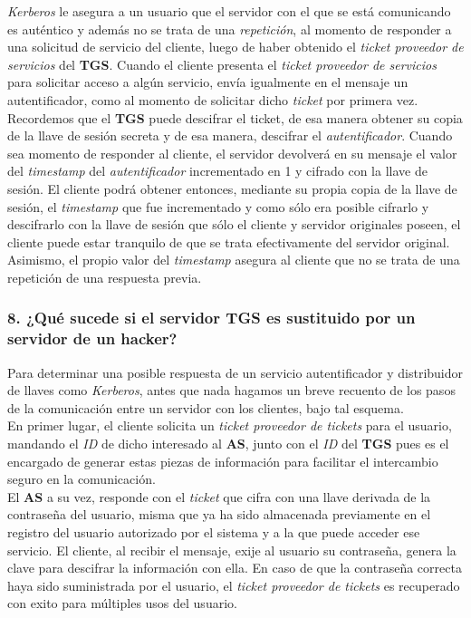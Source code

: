 \documentclass[12pt]{article}
\begin{document}
\textit{Kerberos} le asegura a un usuario que el servidor con el que se está comunicando es auténtico y además no se trata de una
\textit{repetición}, al momento de responder a una solicitud de servicio del cliente, luego de haber obtenido el \textit{ticket proveedor de servicios} del \textbf{TGS}.
Cuando el cliente presenta el \textit{ticket proveedor de servicios} para solicitar acceso a algún servicio, envía igualmente en el mensaje un autentificador, como al momento de solicitar dicho \textit{ticket} por primera vez. Recordemos que el \textbf{TGS} puede descifrar el ticket, de esa manera obtener su copia de la llave de sesión secreta y de esa manera, descifrar el \textit{autentificador}.
Cuando sea momento de responder al cliente, el servidor devolverá en su mensaje el valor del \textit{timestamp} del \textit{autentificador} incrementado en 1 y cifrado con
la llave de sesión. El cliente podrá obtener entonces, mediante su propia copia de la llave de sesión, el \textit{timestamp} que fue incrementado y como sólo era posible cifrarlo y descifrarlo con la llave de sesión que sólo el cliente y servidor originales poseen, el cliente puede estar tranquilo de que se trata efectivamente del servidor original. Asimismo, el propio valor del \textit{timestamp} asegura al cliente que no se trata de una
repetición de una respuesta previa. 


\subsubsection*{8. ¿Qué sucede si el servidor TGS es sustituido por un servidor de un hacker? }
Para determinar una posible respuesta de un servicio autentificador y distribuidor de llaves como
\textit{Kerberos}, antes que nada hagamos un breve recuento de los pasos de la comunicación entre un
servidor con los clientes, bajo tal esquema. \\

En primer lugar, el cliente solicita un \textit{ticket proveedor de tickets} para el usuario, mandando
el \textit{ID} de dicho interesado al \textbf{AS}, junto con el \textit{ID} del \textbf{TGS} pues es
el encargado de generar estas piezas de información para facilitar el intercambio seguro en la comunicación.\\

El \textbf{AS} a su vez, responde con el \textit{ticket} que cifra con una llave derivada de la contraseña del usuario, misma que ya ha sido almacenada previamente en el registro del usuario autorizado por
el sistema y a la que puede acceder ese servicio. El cliente, al recibir el mensaje, exije al usuario
su contraseña, genera la clave para descifrar la información con ella. En caso de que la contraseña correcta haya sido suministrada por el usuario, el \textit{ticket proveedor de tickets} es recuperado con exito para múltiples usos del usuario. \\
\end{document}
